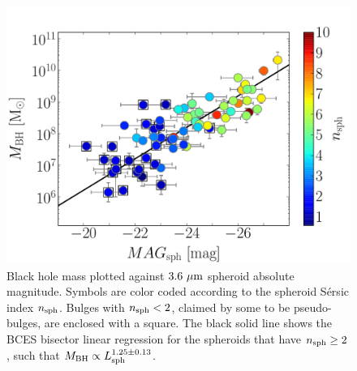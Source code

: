 \documentclass[preprint2]{emulateapj}
\begin{document}
\begin{figure}[h]
\begin{center}
\includegraphics[width=\columnwidth]{images/mbh_vs_mag_sph_psb.pdf}
\caption{Black hole mass plotted against $3.6\rm~\mu m$ spheroid absolute magnitude. 
Symbols are color coded according to the spheroid S\'ersic index $n_{\rm sph}$. 
Bulges with $n_{\rm sph}<2$, claimed by some to be pseudo-bulges, are enclosed with a square. 
The black solid line shows the BCES bisector linear regression for the spheroids that have $n_{\rm sph} \geq 2$, 
such that $M_{\rm BH} \propto L_{\rm sph}^{1.25 \pm 0.13}$. }
\label{fig:pseudob}
\end{center}
\end{figure}
\end{document}
